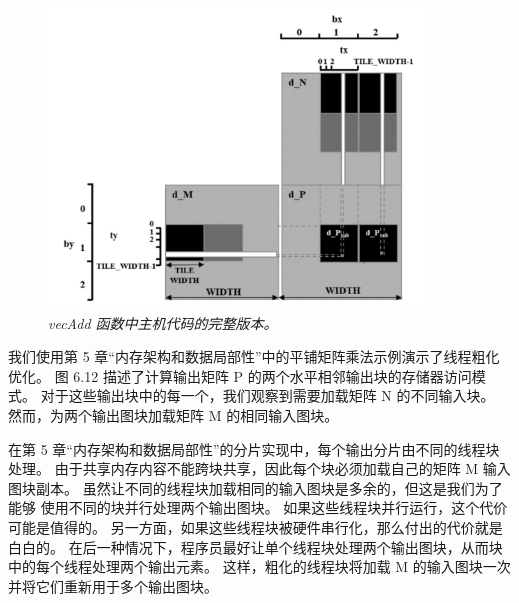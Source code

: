 \begin{figure}[H]
	\centering
	\includegraphics[width=0.9\textwidth]{figs/F6.12.png}
	\caption{\textit{\color{red} vecAdd 函数中主机代码的完整版本。}}
\end{figure}

我们使用第 5 章“内存架构和数据局部性”中的平铺矩阵乘法示例演示了线程粗化优化。 
图 6.12 描述了计算输出矩阵 P 的两个水平相邻输出块的存储器访问模式。
对于这些输出块中的每一个，我们观察到需要加载矩阵 N 的不同输入块。 然而，为两个输出图块加载矩阵 M 的相同输入图块。

在第 5 章“内存架构和数据局部性”的分片实现中，每个输出分片由不同的线程块处理。 
由于共享内存内容不能跨块共享，因此每个块必须加载自己的矩阵 M 输入图块副本。
虽然让不同的线程块加载相同的输入图块是多余的，但这是我们为了能够 使用不同的块并行处理两个输出图块。 
如果这些线程块并行运行，这个代价可能是值得的。 另一方面，如果这些线程块被硬件串行化，那么付出的代价就是白白的。 
在后一种情况下，程序员最好让单个线程块处理两个输出图块，从而块中的每个线程处理两个输出元素。 
这样，粗化的线程块将加载 M 的输入图块一次并将它们重新用于多个输出图块。

